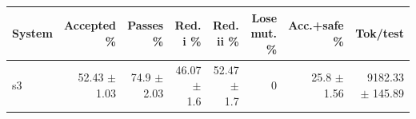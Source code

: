 \begin{tabular}{lrrrrrrr}
\toprule
System & Accepted \% & Passes \% & Red. i \% & Red. ii \% & Lose mut. \% & Acc.+safe \% & Tok/test \\
\midrule
s3 & 52.43 $\pm$ 1.03 & 74.9 $\pm$ 2.03 & 46.07 $\pm$ 1.6 & 52.47 $\pm$ 1.7 & 0 & 25.8 $\pm$ 1.56 & 9182.33 $\pm$ 145.89 \\
\bottomrule
\end{tabular}
